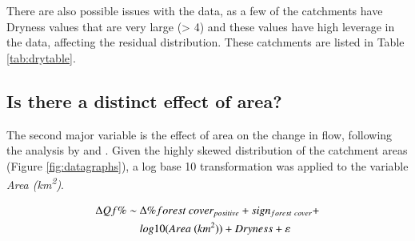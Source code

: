 \documentclass[]{elsarticle} %
\begin{document}
There are also possible issues with the data, as a few of the catchments have Dryness values that are very large (\textgreater{} 4) and these values have high leverage in the data, affecting the residual distribution. These catchments are listed in Table \ref{tab:drytable}.

\hypertarget{is-there-a-distinct-effect-of-area}{%
\subsection{Is there a distinct effect of area?}\label{is-there-a-distinct-effect-of-area}}

The second major variable is the effect of area on the change in flow, following the analysis by \citet{zhang2017} and \citet{filoso2017}. Given the highly skewed distribution of the catchment areas (Figure \ref{fig:datagraphs}), a log base 10 transformation was applied to the variable \emph{Area (km\textsuperscript{2})}.

\begin{align}
\Delta Qf \% \sim ~ & \Delta \% forest~cover_{positive} + sign_{forest~cover} + \notag \\ & log10(Area ~(km^2)) + Dryness + \varepsilon \label{eq:eq6}
\end{align}
\end{document}
